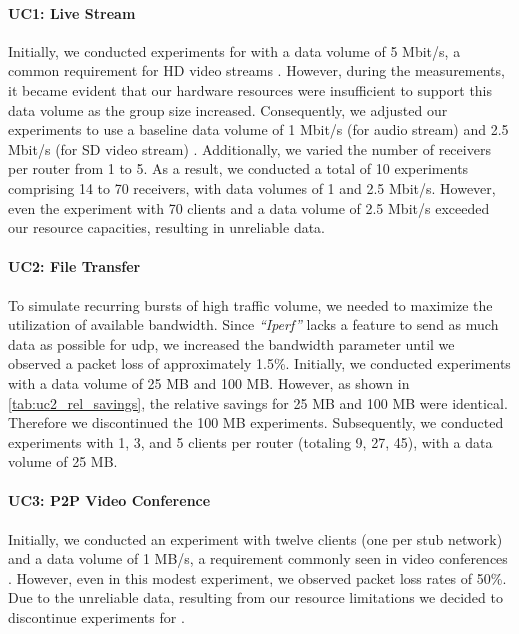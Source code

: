 \paragraph{UC1: Live Stream} %
\label{par:UC1}
Initially, we conducted experiments for \uci{} with a data volume of 5 Mbit/s,
    a common requirement for HD video streams \cite{cartesian_us_bw}.
However, during the measurements, it became evident that our hardware resources
    were insufficient to support this data volume as the group size increased.
Consequently, we adjusted our experiments to use a baseline data volume of 1
    Mbit/s (for audio stream) and 2.5 Mbit/s (for SD video stream)
    \cite{cartesian_us_bw}.
Additionally, we varied the number of receivers per router from 1 to 5.
As a result, we conducted a  total of 10 experiments comprising 14 to 70
    receivers, with data volumes of 1 and 2.5 Mbit/s.
However, even the experiment with 70 clients and a data volume of 2.5 Mbit/s 
    exceeded our resource capacities, resulting in unreliable data.

\paragraph{UC2: File Transfer} %
\label{par:UC2}
To simulate recurring bursts of high traffic volume, we needed to maximize the
    utilization of available bandwidth.
Since \textit{``Iperf''} lacks a feature to send as much data as possible for
    \gls{udp}, we increased the bandwidth parameter until we observed a packet
    loss of approximately 1.5\%.
Initially, we conducted experiments with a data volume of 25 MB and 100 MB.
However, as shown in \autoref{tab:uc2_rel_savings}, the relative savings for 
    25 MB and 100 MB were identical.
Therefore we discontinued the 100 MB experiments.
Subsequently, we conducted experiments with 1, 3, and 5 clients per router
    (totaling 9, 27, 45), with a data volume of 25 MB.

\paragraph{UC3: P2P Video Conference} %
\label{par:UC3}
Initially, we conducted an experiment with twelve clients (one per stub network) and
    a data volume of 1 MB/s, a requirement commonly seen in video conferences
    \cite{cartesian_us_bw}.
However, even in this modest experiment, we observed packet loss rates of
    50\%.
Due to the unreliable data, resulting from our resource limitations we decided
    to discontinue experiments for \uciii{}.

